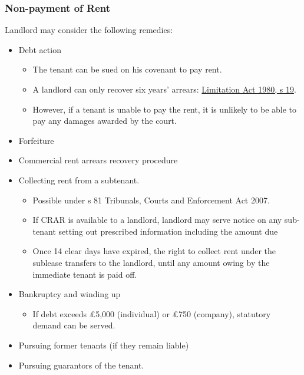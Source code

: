 \documentclass[
]{article}
\providecommand{\tightlist}{%
  \setlength{\itemsep}{0pt}\setlength{\parskip}{0pt}}
\begin{document}
\hypertarget{non-payment-of-rent}{%
\subsubsection{Non-payment of Rent}\label{non-payment-of-rent}}

Landlord may consider the following remedies:

\begin{itemize}
\tightlist
\item
  Debt action

  \begin{itemize}
  \tightlist
  \item
    The tenant can be sued on his covenant to pay rent.
  \item
    A landlord can only recover six years' arrears:
    \href{https://www.legislation.gov.uk/ukpga/1980/58/section/19}{Limitation
    Act 1980, s 19}.
  \item
    However, if a tenant is unable to pay the rent, it is unlikely to be
    able to pay any damages awarded by the court.
  \end{itemize}
\item
  Forfeiture
\item
  Commercial rent arrears recovery procedure
\item
  Collecting rent from a subtenant.

  \begin{itemize}
  \tightlist
  \item
    Possible under s 81 Tribunals, Courts and Enforcement Act 2007.
  \item
    If CRAR is available to a landlord, landlord may serve notice on any
    sub-tenant setting out prescribed information including the amount
    due
  \item
    Once 14 clear days have expired, the right to collect rent under the
    sublease transfers to the landlord, until any amount owing by the
    immediate tenant is paid off.
  \end{itemize}
\item
  Bankruptcy and winding up

  \begin{itemize}
  \tightlist
  \item
    If debt exceeds £5,000 (individual) or £750 (company), statutory
    demand can be served.
  \end{itemize}
\item
  Pursuing former tenants (if they remain liable)
\item
  Pursuing guarantors of the tenant.
\end{itemize}
\end{document}
